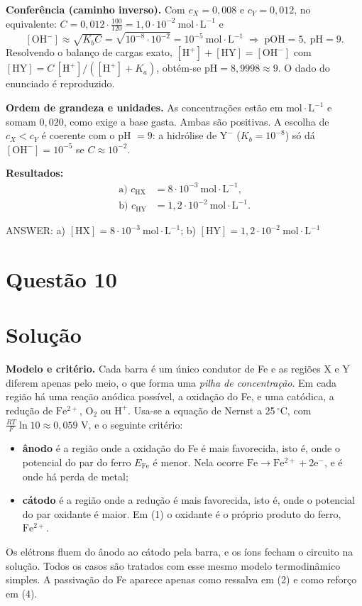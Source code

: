 \documentclass{article}%
\begin{document}
\textbf{Conferência (caminho inverso).} Com $c_X=0{,}008$ e $c_Y=0{,}012$, no equivalente: $C=0{,}012\cdot\frac{100}{120}=1{,}0\cdot10^{-2}\ \mathrm{mol\cdot L^{-1}}$ e
\[
[\mathrm{OH^-}]\approx\sqrt{K_bC}=\sqrt{10^{-8}\cdot10^{-2}}=10^{-5}\ \mathrm{mol\cdot L^{-1}}\;\Rightarrow\;\mathrm{pOH}=5,\ \mathrm{pH}=9.
\]
Resolvendo o balanço de cargas exato, $[\mathrm{H^+}]+[\mathrm{HY}]=[\mathrm{OH^-}]$ com $[\mathrm{HY}]=C\,[\mathrm{H^+}]/([\mathrm{H^+}]+K_a)$, obtém-se $\mathrm{pH}=8{,}9998\approx9$. O dado do enunciado é reproduzido.

\textbf{Ordem de grandeza e unidades.} As concentrações estão em $\mathrm{mol\cdot L^{-1}}$ e somam $0{,}020$, como exige a base gasta. Ambas são positivas. A escolha de $c_X<c_Y$ é coerente com o pH $=9$: a hidrólise de $\mathrm{Y^-}$ ($K_b=10^{-8}$) só dá $[\mathrm{OH^-}]=10^{-5}$ se $C\approx10^{-2}$.

\textbf{Resultados:}
\begin{align*}
\text{a) } c_{\mathrm{HX}} &= 8\cdot10^{-3}\ \mathrm{mol\cdot L^{-1}},\\
\text{b) } c_{\mathrm{HY}} &= 1{,}2\cdot10^{-2}\ \mathrm{mol\cdot L^{-1}}.
\end{align*}

ANSWER: a) $[\mathrm{HX}] = 8\cdot10^{-3}\ \mathrm{mol\cdot L^{-1}}$; b) $[\mathrm{HY}] = 1{,}2\cdot10^{-2}\ \mathrm{mol\cdot L^{-1}}$%
\newpage%
\section*{Questão 10}

\section*{Solução}

\textbf{Modelo e critério.} Cada barra é um único condutor de Fe e as regiões X e Y diferem apenas pelo meio, o que forma uma \emph{pilha de concentração}. Em cada região há uma reação anódica possível, a oxidação do Fe, e uma catódica, a redução de $\mathrm{Fe^{2+}}$, $\mathrm{O_2}$ ou $\mathrm{H^+}$. Usa-se a equação de Nernst a 25\,$^\circ$C, com $\frac{RT}{F}\ln 10\approx 0{,}059$ V, e o seguinte critério:
\begin{itemize}
\item \textbf{ânodo} é a região onde a oxidação do Fe é mais favorecida, isto é, onde o potencial do par do ferro $E_{\mathrm{Fe}}$ é menor. Nela ocorre $\mathrm{Fe\to Fe^{2+}+2e^-}$, e é onde há perda de metal;
\item \textbf{cátodo} é a região onde a redução é mais favorecida, isto é, onde o potencial do par oxidante é maior. Em (1) o oxidante é o próprio produto do ferro, $\mathrm{Fe^{2+}}$.
\end{itemize}
Os elétrons fluem do ânodo ao cátodo pela barra, e os íons fecham o circuito na solução. Todos os casos são tratados com esse mesmo modelo termodinâmico simples. A passivação do Fe aparece apenas como ressalva em (2) e como reforço em (4).
\end{document}
